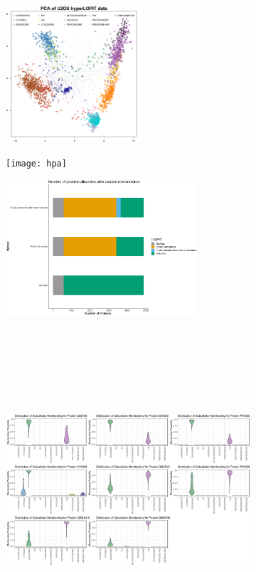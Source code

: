 \documentclass[12pt,english]{article}
\begin{document}
\begin{figure}[h]
	\begin{subfigure}[t]{0.3\textwidth}
		\centering
		\includegraphics[height=2in]{u2ospcaF}
		\caption{}
	\end{subfigure}
	\begin{subfigure}[t]{0.3\textwidth}
	\centering
	\texttt{[image: hpa]}
	\caption{}
	\end{subfigure}
	\begin{subfigure}[t]{0.3\textwidth}
	\centering
	\includegraphics[height=2in]{summaryu2os}
	\caption{}
	\end{subfigure}
	~
	\begin{subfigure}[t]{1\textwidth}
		\centering
		\includegraphics[height=4in]{endoViolin}

\end{subfigure}
\end{figure}
\end{document}
